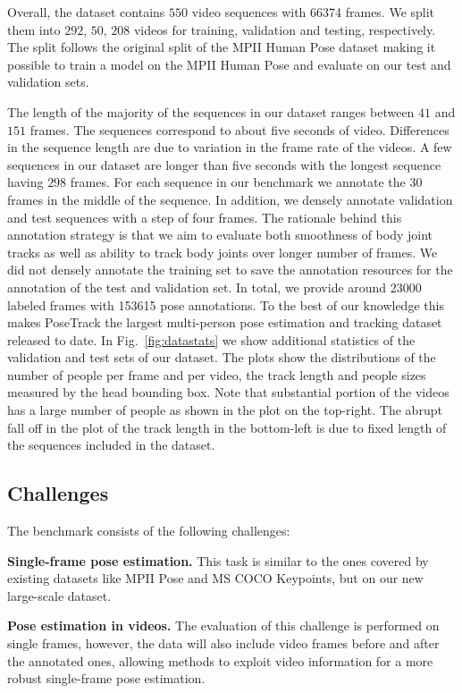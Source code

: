 \documentclass[10pt,twocolumn,letterpaper]{article}
\newcommand{\myparagraph}[1]{\vspace{0.1em}\noindent\textbf{#1}}
\begin{document}
Overall, the dataset contains $550$ video sequences with \num{66374}
frames. We split them into $292$, $50$, $208$ videos for training, validation
and testing, respectively. The split follows the original split of the MPII
Human Pose dataset making it possible to train a model on the MPII Human Pose
and evaluate on our test and validation sets. 


The length of the majority of the sequences in our dataset ranges between
$41$ and $151$ frames. The sequences correspond to about five seconds of
video. Differences in the sequence length are due to variation in the frame
rate of the videos. A few sequences in our dataset are longer than five seconds
with the longest sequence having $298$ frames. For each sequence in our
benchmark we annotate the $30$ frames in the middle of the sequence. In
addition, we densely annotate validation and test sequences with a step of four
frames. The rationale behind this annotation strategy is that we aim to evaluate both
smoothness of body joint tracks as well as ability to track body joints over
longer number of frames. We did not densely annotate the training set to save
the annotation resources for the annotation of the test and validation set.
In total, we provide around \num{23000} labeled frames with \num{153615}
pose annotations. To the best of our knowledge this makes PoseTrack the largest multi-person pose
estimation and tracking dataset released to date.  In Fig.~\ref{fig:datastats} we show additional
statistics of the validation and test sets of our dataset. The plots show the
distributions of the number of people per frame and per video, the track length and
people sizes measured by the head bounding box. Note that substantial portion of
the videos has a large number of people as shown in the plot on the
top-right. The abrupt fall off in the plot of the track length in the
bottom-left is due to fixed length of the sequences included in the dataset.



\subsection{Challenges} The benchmark consists of the following challenges:


\myparagraph{Single-frame pose estimation.} This task is similar to the ones covered by existing datasets like MPII Pose and MS COCO Keypoints, but on our new large-scale dataset.

\myparagraph{Pose estimation in videos.} The evaluation of this challenge is performed on single frames, however, the data will also include video frames before and after the annotated ones, allowing methods to exploit video information for a more robust single-frame pose estimation.
\end{document}
